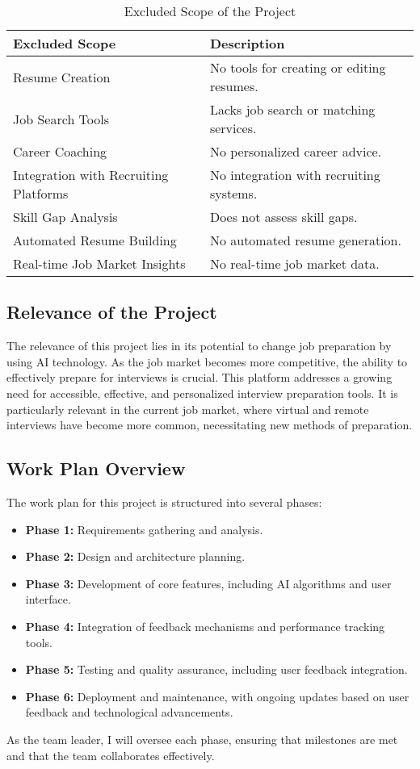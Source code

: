 \begin{table}[h]
    \centering
    \caption{Excluded Scope of the Project}
    \begin{tabular}{@{}ll@{}}
    \toprule
    \textbf{Excluded Scope} & \textbf{Description} \\ 
    \midrule
    Resume Creation & No tools for creating or editing resumes. \\ 
    Job Search Tools & Lacks job search or matching services. \\ 
    Career Coaching & No personalized career advice. \\ 
    Integration with Recruiting Platforms & No integration with recruiting systems. \\ 
    Skill Gap Analysis & Does not assess skill gaps. \\ 
    Automated Resume Building & No automated resume generation. \\ 
    Real-time Job Market Insights & No real-time job market data. \\ 
    \bottomrule
    \end{tabular}
\end{table}


\subsection{Relevance of the Project}
The relevance of this project lies in its potential to change job preparation by using AI technology. As the job market becomes more competitive, the ability to effectively prepare for interviews is crucial. This platform addresses a growing need for accessible, effective, and personalized interview preparation tools. It is particularly relevant in the current job market, where virtual and remote interviews have become more common, necessitating new methods of preparation.

\subsection{Work Plan Overview}
The work plan for this project is structured into several phases:
\begin{itemize}
    \item \textbf{Phase 1:} Requirements gathering and analysis.
    \item \textbf{Phase 2:} Design and architecture planning.
    \item \textbf{Phase 3:} Development of core features, including AI algorithms and user interface.
    \item \textbf{Phase 4:} Integration of feedback mechanisms and performance tracking tools.
    \item \textbf{Phase 5:} Testing and quality assurance, including user feedback integration.
    \item \textbf{Phase 6:} Deployment and maintenance, with ongoing updates based on user feedback and technological advancements.
\end{itemize}
As the team leader, I will oversee each phase, ensuring that milestones are met and that the team collaborates effectively.

